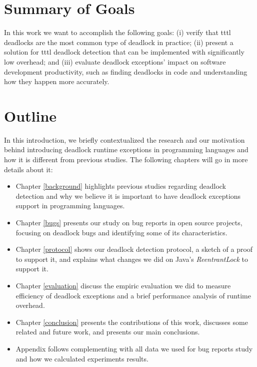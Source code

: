 \section{Summary of Goals}

In this work we want to accomplish the following goals:
(i) verify that \ac{tttl} deadlocks are the most common type of deadlock in practice;
(ii) present a solution for \ac{tttl} deadlock detection that can be implemented with significantly low overhead;
and (iii) evaluate deadlock exceptions' impact on software development productivity, such as finding deadlocks in code and understanding how they happen more accurately.

\section{Outline}

In this introduction, we briefly contextualized the research and our motivation behind introducing deadlock runtime exceptions in programming languages
and how it is different from previous studies. The following chapters will go in more details about it:


\begin{itemize}
\item
Chapter \ref{background} highlights previous studies regarding deadlock detection and why we believe it is important to have deadlock exceptions support in programming languages.
\item
Chapter \ref{bugs} presents our study on bug reports in open source projects, focusing on deadlock bugs and identifying some of its characteristics.
\item
Chapter \ref{protocol} shows our deadlock detection protocol, a sketch of a proof to support it, and explains what changes we did on Java's \emph{ReentrantLock} to support it.
\item
Chapter \ref{evaluation} discuss the empiric evaluation we did to measure efficiency of deadlock exceptions and a brief performance analysis of runtime overhead.
\item
Chapter \ref{conclusion} presents the contributions of this work, discusses some related and future work, and presents our main conclusions.
\item
Appendix follows complementing with all data we used for bug reports study and how we calculated experiments results.

\end{itemize}


